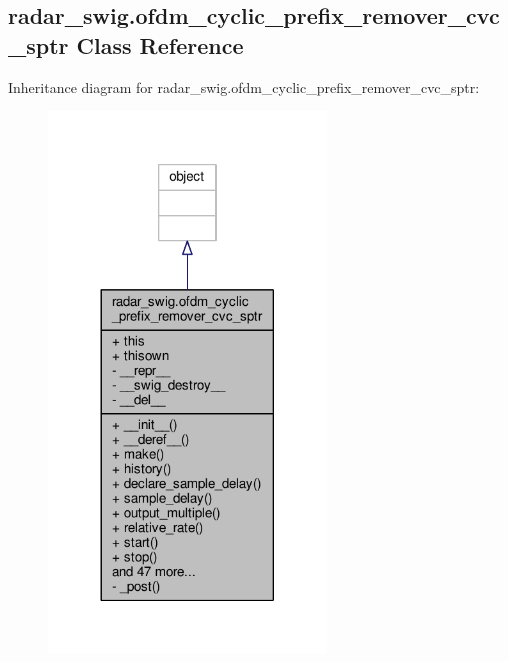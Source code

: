 \subsection{radar\+\_\+swig.\+ofdm\+\_\+cyclic\+\_\+prefix\+\_\+remover\+\_\+cvc\+\_\+sptr Class Reference}
\label{classradar__swig_1_1ofdm__cyclic__prefix__remover__cvc__sptr}


Inheritance diagram for radar\+\_\+swig.\+ofdm\+\_\+cyclic\+\_\+prefix\+\_\+remover\+\_\+cvc\+\_\+sptr\+:
\nopagebreak
\begin{figure}[H]
\begin{center}
\leavevmode
\includegraphics[width=209pt]{d1/de8/classradar__swig_1_1ofdm__cyclic__prefix__remover__cvc__sptr__inherit__graph}
\end{center}
\end{figure}


